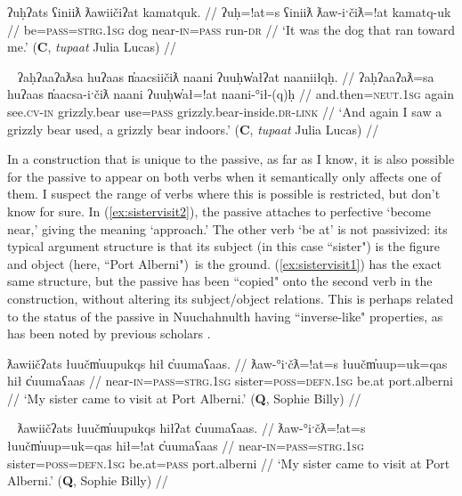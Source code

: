 \ex \label{ex:dograntowardme}
\begingl
\glpreamble ʔuḥʔats ʕiniiƛ ƛawiičiʔat kamatquk. //
\gla ʔuḥ=!at=s ʕiniiƛ ƛaw-iˑčiƛ=!at kamatq-uk //
\glb be=\textsc{pass}=\textsc{strg.1sg} dog near-\textsc{in}=\textsc{pass} run-\textsc{dr} //
\glft `It was the dog that ran toward me.' (\textbf{C}, \textit{tupaat} Julia Lucas) //
\endgl
\xe

\ex~ \label{ex:grizzlybearused}
\begingl
\glpreamble ʔaḥʔaaʔaƛsa huʔaas n̓aacsiičiƛ naani ʔuuḥw̓ałʔat naaniiłqḥ. //
\gla ʔaḥʔaaʔaƛ=sa huʔaas n̓aacsa-iˑčiƛ naani ʔuuḥw̓ał=!at naani-°ił-(q)ḥ //
\glb and.then=\textsc{neut.1sg} again see.\textsc{cv}-\textsc{in} grizzly.bear use=\textsc{pass} grizzly.bear-inside.\textsc{dr}-\textsc{link} //
\glft `And again I saw a grizzly bear used, a grizzly bear indoors.' (\textbf{C}, \textit{tupaat} Julia Lucas) //
\endgl
\xe

In a construction that is unique to the passive, as far as I know, it is also possible for the passive to appear on both verbs when it semantically only affects one of them. I suspect the range of verbs where this is possible is restricted, but don't know for sure. In (\ref{ex:sistervisit2}), the passive attaches to perfective `become near,' giving the meaning `approach.' The other verb `be at' is not passivized: its typical argument structure is that its subject (in this case ``sister") is the figure and object (here, ``Port Alberni") is the ground. (\ref{ex:sistervisit1}) has the exact same structure, but the passive has been ``copied" onto the second verb in the construction, without altering its subject/object relations. This is perhaps related to the status of the passive in Nuuchahnulth having ``inverse-like" properties, as has been noted by previous scholars \citep{emanatian1988, braithwaite2003}.

\ex \label{ex:sistervisit2}
\begingl
\glpreamble ƛawiičʔats łuučm̓uupukqs hił c̓uumaʕaas. //
\gla ƛaw-°iˑčƛ=!at=s łuučm̓uup=uk=qas hił c̓uumaʕaas //
\glb near-\textsc{in}=\textsc{pass}=\textsc{strg.1sg} sister=\textsc{poss}=\textsc{defn.1sg} be.at port.alberni //
\glft `My sister came to visit at Port Alberni.' (\textbf{Q}, Sophie Billy) //
\endgl
\xe

\ex~ \label{ex:sistervisit1}
\begingl
\glpreamble ƛawiičʔats łuučm̓uupukqs hiłʔat c̓uumaʕaas. //
\gla ƛaw-°iˑčƛ=!at=s łuučm̓uup=uk=qas hił=!at c̓uumaʕaas //
\glb near-\textsc{in}=\textsc{pass}=\textsc{strg.1sg} sister=\textsc{poss}=\textsc{defn.1sg} be.at=\textsc{pass} port.alberni //
\glft `My sister came to visit at Port Alberni.' (\textbf{Q}, Sophie Billy) //
\endgl
\xe

